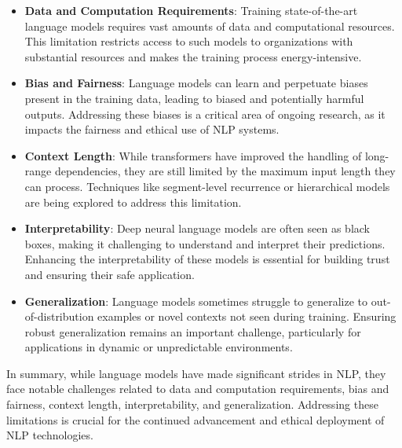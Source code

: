 \begin{itemize}
    \item \textbf{Data and Computation Requirements}: Training state-of-the-art language models requires vast amounts of data and computational resources. This limitation restricts access to such models to organizations with substantial resources and makes the training process energy-intensive.

    \item \textbf{Bias and Fairness}: Language models can learn and perpetuate biases present in the training data, leading to biased and potentially harmful outputs. Addressing these biases is a critical area of ongoing research, as it impacts the fairness and ethical use of NLP systems.

    \item \textbf{Context Length}: While transformers have improved the handling of long-range dependencies, they are still limited by the maximum input length they can process. Techniques like segment-level recurrence or hierarchical models are being explored to address this limitation.

    \item \textbf{Interpretability}: Deep neural language models are often seen as black boxes, making it challenging to understand and interpret their predictions. Enhancing the interpretability of these models is essential for building trust and ensuring their safe application.

    \item \textbf{Generalization}: Language models sometimes struggle to generalize to out-of-distribution examples or novel contexts not seen during training. Ensuring robust generalization remains an important challenge, particularly for applications in dynamic or unpredictable environments.
\end{itemize}

In summary, while language models have made significant strides in NLP, they face notable challenges related to data and computation requirements, bias and fairness, context length, interpretability, and generalization. Addressing these limitations is crucial for the continued advancement and ethical deployment of NLP technologies.

